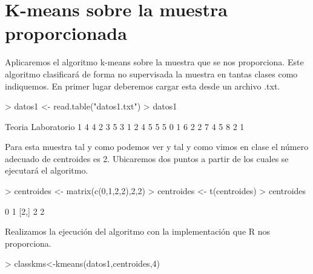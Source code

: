 \documentclass [a4paper] {article}
\begin{document}
\newpage
\section{K-means sobre la muestra proporcionada}

Aplicaremos el algoritmo k-means sobre la muestra que se nos proporciona.
Este algoritmo clasificará de forma no supervisada la muestra en tantas clases como indiquemos.
En primer lugar deberemos cargar esta desde un archivo .txt.
\begin{Schunk}
\begin{Sinput}
> datos1 <- read.table("datos1.txt")
> datos1
\end{Sinput}
\begin{Soutput}
  Teoria Laboratorio
1      4           4
2      3           5
3      1           2
4      5           5
5      0           1
6      2           2
7      4           5
8      2           1
\end{Soutput}
\end{Schunk}

Para esta muestra tal y como podemos ver y tal y como vimos en clase el número adecuado de centroides es 2.
Ubicaremos dos puntos a partir de los cuales se ejecutará el algoritmo.
\begin{Schunk}
\begin{Sinput}
> centroides <- matrix(c(0,1,2,2),2,2)
> centroides <- t(centroides)
> centroides
\end{Sinput}
\begin{Soutput}
     [,1] [,2]
[1,]    0    1
[2,]    2    2
\end{Soutput}
\end{Schunk}

Realizamos la ejecución del algoritmo con la implementación que R nos proporciona.
\begin{Schunk}
\begin{Sinput}
> classkms<-kmeans(datos1,centroides,4)
\end{Sinput}
\end{Schunk}
\end{document}
